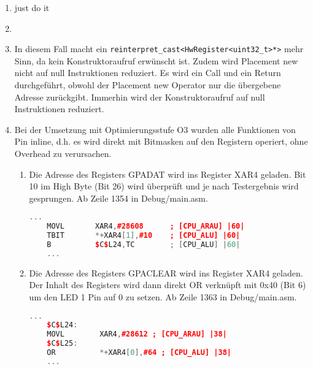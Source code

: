 \begin{enumerate}
  \item just do it
  \item 
  \item In diesem Fall macht ein \texttt{reinterpret\_cast<HwRegister<uint32\_t>*>} mehr Sinn, da kein Konstruktoraufruf erwünscht ist. Zudem wird Placement new nicht auf null Instruktionen reduziert. Es wird ein Call und ein Return durchgeführt, obwohl der Placement new Operator nur die übergebene Adresse zurückgibt. Immerhin wird der Konstruktoraufruf auf null Instruktionen reduziert.
  
  \item Bei der Umsetzung mit Optimierungsstufe O3 wurden alle Funktionen von Pin inline, d.h. es wird direkt mit Bitmasken auf den Registern operiert, ohne Overhead zu verursachen.
  \begin{enumerate}
    \item Die Adresse des Registers GPADAT wird ins Register XAR4 geladen. Bit 10 im High Byte (Bit 26) wird überprüft und je nach Testergebnis wird gesprungen. Ab Zeile 1354 in Debug/main.asm.
    \begin{lstlisting}[language=C++, style=C++]
    ...
    MOVL       XAR4,#28608      ; [CPU_ARAU] |60|
    TBIT       *+XAR4[1],#10    ; [CPU_ALU] |60|
    B          $C$L24,TC        ; [CPU_ALU] |60|
    ...
    \end{lstlisting}
    \item Die Adresse des Registers GPACLEAR wird ins Register XAR4 geladen. Der Inhalt des Registers wird dann direkt OR verknüpft mit 0x40 (Bit 6) um den LED 1 Pin auf 0 zu setzen. Ab Zeile 1363 in Debug/main.asm.
    \begin{lstlisting}[language=C++, style=C++]
    ...
    $C$L24:
    MOVL        XAR4,#28612 ; [CPU_ARAU] |38|
    $C$L25:
    OR          *+XAR4[0],#64 ; [CPU_ALU] |38|
    ...
    \end{lstlisting}
  \end{enumerate}
\end{enumerate}
